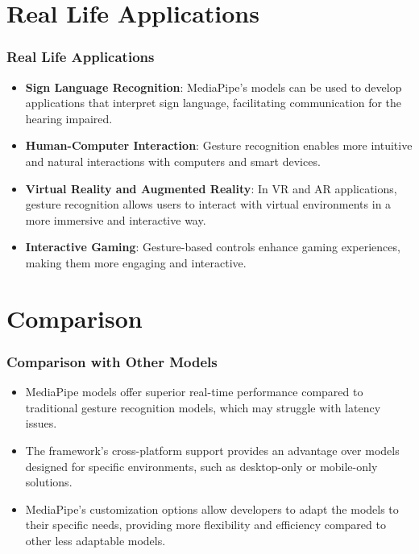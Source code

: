 \documentclass[aspectratio=169, hideothersubsections]{beamer}
\begin{document}
\section{Real Life Applications}
\begin{frame}
    \frametitle{Real Life Applications}
    \begin{itemize}
        \item \textbf{Sign Language Recognition}: MediaPipe's models can be used to develop applications that interpret sign language, facilitating communication for the hearing impaired.
        \item \textbf{Human-Computer Interaction}: Gesture recognition enables more intuitive and natural interactions with computers and smart devices.
        \item \textbf{Virtual Reality and Augmented Reality}: In VR and AR applications, gesture recognition allows users to interact with virtual environments in a more immersive and interactive way.
        \item \textbf{Interactive Gaming}: Gesture-based controls enhance gaming experiences, making them more engaging and interactive.
    \end{itemize}
\end{frame}

\section{Comparison}
\begin{frame}
    \frametitle{Comparison with Other Models}
    \begin{itemize}
        \item MediaPipe models offer superior real-time performance compared to traditional gesture recognition models, which may struggle with latency issues.
        \item The framework's cross-platform support provides an advantage over models designed for specific environments, such as desktop-only or mobile-only solutions.
        \item MediaPipe's customization options allow developers to adapt the models to their specific needs, providing more flexibility and efficiency compared to other less adaptable models.
    \end{itemize}
\end{frame}
\end{document}

